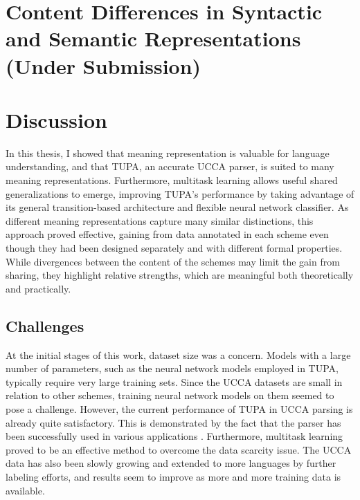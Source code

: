 \documentclass[12pt,a4paper]{report}
\begin{document}


\chapter{Content Differences in Syntactic and Semantic Representations \\ (Under Submission)}



\chapter{Discussion}

In this thesis, I showed that meaning representation is valuable for language understanding,
and that TUPA, an accurate UCCA parser, is suited to many meaning representations.
Furthermore, multitask learning allows useful shared generalizations to emerge,
improving TUPA's performance by taking advantage of its general transition-based
architecture and flexible neural network classifier.
As different meaning representations capture many similar distinctions,
this approach proved effective, gaining from data annotated in each scheme
even though they had been designed separately and with different formal properties.
While divergences between the content of the schemes may limit the gain from sharing,
they highlight relative strengths, which are meaningful both theoretically and practically.

\section*{Challenges}

At the initial stages of this work, dataset size was a concern.
Models with a large number of parameters,
such as the neural network models employed in TUPA,
typically require very large training sets.
Since the UCCA datasets are small in relation to other schemes,
training neural network models on them seemed to pose a challenge.
However,
the current performance of TUPA in UCCA parsing is already quite satisfactory.
This is demonstrated by the fact that the parser has been successfully used in
various applications \cite{choshen2018reference,sulem2018semantic,sulem2018simple}.
Furthermore,
multitask learning proved to be an effective method to overcome the data scarcity issue.
The UCCA data has also been slowly growing and extended to more languages by further labeling efforts,
and results seem to improve as more and more training data is available.
\end{document}
